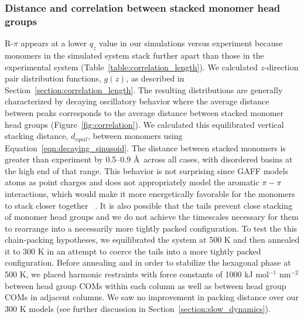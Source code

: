 \documentclass[journal=jpcbfk,manuscript=article]{achemso}
\begin{document}

  \subsubsection*{Distance and correlation between stacked monomer head groups}

  R-$\pi$ appears at a lower $q_z$ value in our simulations versus experiment because
  monomers in the simulated system stack further apart than those in the experimental
  system (Table~\ref{table:correlation_length}). We calculated $z$-direction pair distribution
  functions, $g(z)$, as described in Section~\ref{section:correlation_length}.
  The resulting distributions are generally characterized by decaying
  oscillatory behavior where the average distance between peaks corresponds to
  the average distance between stacked monomer head groups
  (Figure~\ref{fig:correlation}).  We calculated this equilibrated vertical
  stacking distance, $\mathit{d}_{equil}$, between monomers using
  Equation~\ref{eqn:decaying_sinusoid}. The distance between stacked monomers is
  greater than experiment by 0.5--0.9 \AA~across all cases, with disordered
  basins at the high end of that range.%
  This behavior is not surprising since GAFF models atoms as point charges and
  does not appropriately model the aromatic $\pi-\pi$ interactions, which would make
  it more energetically favorable for the monomers to stack closer together ~\cite{wang_development_2004}.
  It is also possible that the tails prevent close stacking of monomer head groups
  and we do not achieve the timescales necessary for them to rearrange into a
  necessarily more tightly packed configuration. To test the this chain-packing hypotheses, 
  we equilibrated the
  system at 500 K and then annealed it to 300 K in an attempt to coerce the tails
  into a more tightly packed configuration. Before annealing and in order to
  stabilize the hexagonal phase at 500 K, we placed harmonic restraints with 
  force constants of 1000 kJ mol$^{-1}$ nm$^{-2}$ between head group COMs
  within each column as well as between head group COMs in
  adjacent columns. We saw no improvement in packing distance over our 300 K
  models (see further discussion in Section~\ref{section:slow_dynamics}). 
  
\end{document}
